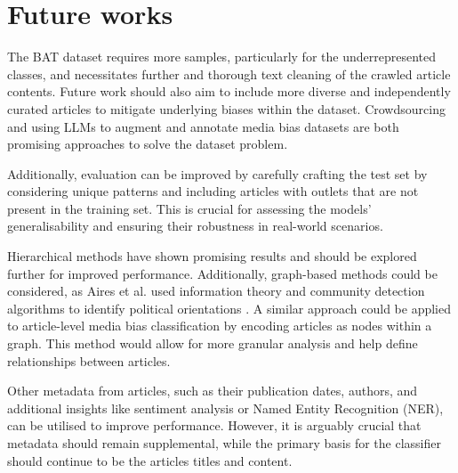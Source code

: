 

\section{Future works}

The BAT dataset requires more samples, particularly for the underrepresented classes, and necessitates further and thorough text cleaning of the crawled article contents. Future work should also aim to include more diverse and independently curated articles to mitigate underlying biases within the dataset. Crowdsourcing \cite{spinde-newsunravel} and using LLMs to augment and annotate media bias datasets \cite{horych-2024-promises} are both promising approaches to solve the dataset problem.

Additionally, evaluation can be improved by carefully crafting the test set by considering unique patterns and including articles with outlets that are not present in the training set. This is crucial for assessing the models' generalisability and ensuring their robustness in real-world scenarios.

Hierarchical methods have shown promising results and should be explored further for improved performance. Additionally, graph-based methods could be considered, as Aires et al. used information theory and community detection algorithms to identify political orientations \cite{aires-2020-information}. A similar approach could be applied to article-level media bias classification by encoding articles as nodes within a graph. This method would allow for more granular analysis and help define relationships between articles.

Other metadata from articles, such as their publication dates, authors, and additional insights like sentiment analysis or Named Entity Recognition (NER), can be utilised to improve performance. However, it is arguably crucial that metadata should remain supplemental, while the primary basis for the classifier should continue to be the articles titles and content.



